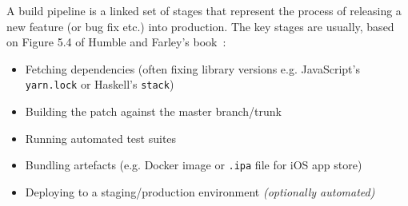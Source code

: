 A build pipeline is a linked set of stages that represent the process of releasing a new feature (or bug fix etc.) into production.
The key stages are usually, based on Figure 5.4 of Humble and Farley's book~\cite{DeployPipe}:
\begin{itemize}
  \item Fetching dependencies (often fixing library versions e.g. JavaScript's \texttt{yarn.lock} or Haskell's \texttt{stack})
  \item Building the patch against the master branch/trunk
  \item Running automated test suites
  \item Bundling artefacts (e.g. Docker image or \texttt{.ipa} file for iOS app store)
  \item Deploying to a staging/production environment \textit{(optionally automated)}
\end{itemize}

